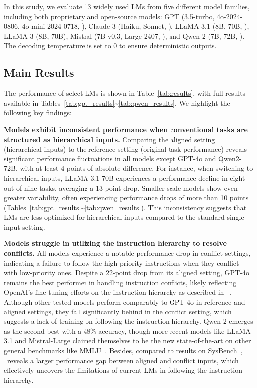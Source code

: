 


In this study, we evaluate 13 widely used LMs from five different model families, including both proprietary and open-source models: GPT (3.5-turbo, 4o-2024-0806, 4o-mini-2024-0718, \citealp{GPT4}), Claude-3 (Haiku, Sonnet, \citealp{claude3}), LLaMA-3.1 (8B, 70B, \citealp{llama3}), LLaMA-3 (8B, 70B), Mistral (7B-v0.3, Large-2407, \citealp{mistral-large-2}), and Qwen-2 (7B, 72B, \citealp{qwen2}). The decoding temperature is set to 0 to ensure deterministic outputs. 

\subsection{Main Results}

The performance of select LMs is shown in Table~\ref{tab:results}, with full results available in Tables~\ref{tab:gpt_results}\textasciitilde\ref{tab:qwen_results}. We highlight the following key findings:

\textbf{Models exhibit inconsistent performance when conventional tasks are structured as hierarchical inputs.} Comparing the aligned setting (hierarchical inputs) to the reference setting (original task performance) reveals significant performance fluctuations in all models except GPT-4o and Qwen2-72B, with at least 4 points of absolute difference. For instance, when switching to hierarchical inputs, LLaMA-3.1-70B experiences a performance decline in eight out of nine tasks, averaging a 13-point drop. Smaller-scale models show even greater variability, often experiencing performance drops of more than 10 points (Tables~\ref{tab:gpt_results}\textasciitilde\ref{tab:qwen_results}). This inconsistency suggests that LMs are less optimized for hierarchical inputs compared to the standard single-input setting.

\textbf{Models struggle in utilizing the instruction hierarchy to resolve conflicts.} All models experience a notable performance drop in conflict settings, indicating a failure to follow the high-priority instructions when they conflict with low-priority ones. Despite a 22-point drop from its aligned setting, GPT-4o remains the best performer in handling instruction conflicts, likely reflecting OpenAI's fine-tuning efforts on the instruction hierarchy as described in ~\citet{instruction_hierarchy}. Although other tested models perform comparably to GPT-4o in reference and aligned settings, they fall significantly behind in the conflict setting, which suggests a lack of training on following the instruction hierarchy. Qwen-2 emerges as the second-best with a 48\% accuracy, though more recent models like LLaMA-3.1 and Mistral-Large claimed themselves to be the new state-of-the-art on other general benchmarks like MMLU~\cite{mmlu}. Besides, compared to results on SysBench~\cite{sysbench}, \benchmark\ reveals a larger performance gap between aligned and conflict inputs, which effectively uncovers the limitations of current LMs in following the instruction hierarchy.

